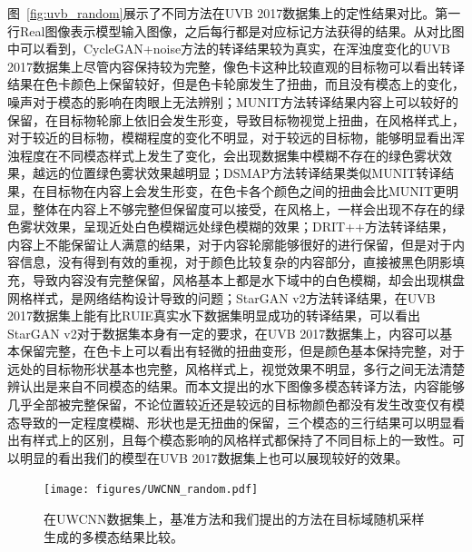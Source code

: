 图~\ref{fig:uvb_random}展示了不同方法在UVB 2017数据集上的定性结果对比。第一行Real图像表示模型输入图像，之后每行都是对应标记方法获得的结果。从对比图中可以看到，CycleGAN+noise方法的转译结果较为真实，在浑浊度变化的UVB 2017数据集上尽管内容保持较为完整，像色卡这种比较直观的目标物可以看出转译结果在色卡颜色上保留较好，但是色卡轮廓发生了扭曲，而且没有模态上的变化，噪声对于模态的影响在肉眼上无法辨别；MUNIT方法转译结果内容上可以较好的保留，在目标物轮廓上依旧会发生形变，导致目标物视觉上扭曲，在风格样式上，对于较近的目标物，模糊程度的变化不明显，对于较远的目标物，能够明显看出浑浊程度在不同模态样式上发生了变化，会出现数据集中模糊不存在的绿色雾状效果，越远的位置绿色雾状效果越明显；DSMAP方法转译结果类似MUNIT转译结果，在目标物在内容上会发生形变，在色卡各个颜色之间的扭曲会比MUNIT更明显，整体在内容上不够完整但保留度可以接受，在风格上，一样会出现不存在的绿色雾状效果，呈现近处白色模糊远处绿色模糊的效果；DRIT++方法转译结果，内容上不能保留让人满意的结果，对于内容轮廓能够很好的进行保留，但是对于内容信息，没有得到有效的重视，对于颜色比较复杂的内容部分，直接被黑色阴影填充，导致内容没有完整保留，风格基本上都是水下域中的白色模糊，却会出现棋盘网格样式，是网络结构设计导致的问题；StarGAN v2方法转译结果，在UVB 2017数据集上能有比RUIE真实水下数据集明显成功的转译结果，可以看出StarGAN v2对于数据集本身有一定的要求，在UVB 2017数据集上，内容可以基本保留完整，在色卡上可以看出有轻微的扭曲变形，但是颜色基本保持完整，对于远处的目标物形状基本也完整，风格样式上，视觉效果不明显，多行之间无法清楚辨认出是来自不同模态的结果。而本文提出的水下图像多模态转译方法，内容能够几乎全部被完整保留，不论位置较近还是较远的目标物颜色都没有发生改变仅有模态导致的一定程度模糊、形状也是无扭曲的保留，三个模态的三行结果可以明显看出有样式上的区别，且每个模态影响的风格样式都保持了不同目标上的一致性。可以明显的看出我们的模型在UVB 2017数据集上也可以展现较好的效果。

\begin{figure}[htp]
    \centering
	\texttt{[image: figures/UWCNN\_random.pdf]}
	\caption{在UWCNN数据集上，基准方法和我们提出的方法在目标域随机采样生成的多模态结果比较。}
	\label{fig:uwcnn_random}
\end{figure}

